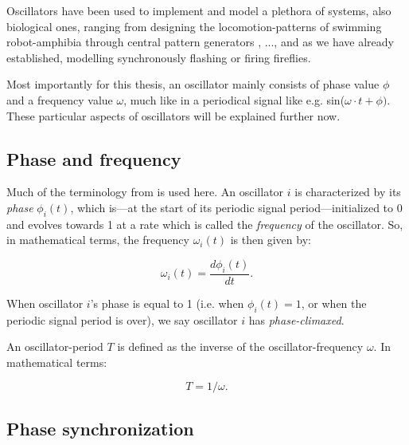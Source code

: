 


Oscillators have been used to implement and model a plethora of systems, also biological ones, ranging from designing the locomotion-patterns of swimming robot-amphibia through central pattern generators \cite{ijspeert_cpg}, ..., and as we have already established, modelling synchronously flashing or firing fireflies.

Most importantly for this thesis, an oscillator mainly consists of phase value $\phi$ and a frequency value $\omega$, much like in a periodical signal like e.g. sin($\omega \cdot t + \phi)$. These particular aspects of oscillators will be explained further now.
	
	
	\subsection{Phase and frequency}
	Much of the terminology from \cite{nymoen_synch} is used here. An oscillator $i$ is characterized by its \textit{phase} $\phi_i(t)$, which is—at the start of its periodic signal period—initialized to 0 and evolves towards 1 at a rate which is called the \textit{frequency} of the oscillator. So, in mathematical terms, the frequency $\omega_i(t)$ is then given by:
	
	\begin{equation}
	\label{phase_freq}
		\omega_i(t) = \frac{d \phi_i(t)}{d t} .
	\end{equation}

	When oscillator $i$'s phase is equal to 1 (i.e. when $\phi_i(t)=1$, or when the periodic signal period is over), we say oscillator $i$ has \textit{phase-climaxed}.
	
	An oscillator-period $T$ is defined as the inverse of the oscillator-frequency $\omega$. In mathematical terms:
	
	\begin{equation}
	\label{period_freq}
		T = 1/\omega .
	\end{equation}
	
	
	\subsection{Phase synchronization}
	
